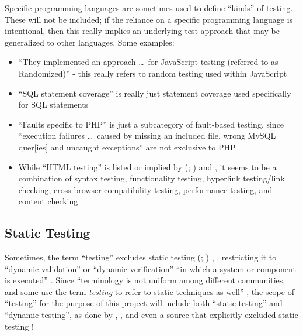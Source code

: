 \ifnotpaper
    Specific programming languages are sometimes used to define ``kinds'' of
    testing. These will not be included; if the reliance
    on a specific programming language is intentional, then this really implies an
    underlying test approach that may be generalized to other languages. Some
    examples:

    \begin{itemize}
        \item ``They implemented an approach \dots\ for JavaScript testing
              (referred to as Randomized)'' \citep[p.~192]{DoğanEtAl2014} -
              this really refers to random testing used within JavaScript
        \item ``SQL statement coverage'' is really just statement coverage
              used specifically for SQL statements \citep[Tab.~13]{DoğanEtAl2014}
        \item ``Faults specific to PHP'' is just a subcategory of fault-based
              testing, since ``execution failures \dots\ caused by missing an
              included file, wrong MySQL quer[ies] and uncaught exceptions''
              are not exclusive to PHP \citep[Tab.~27]{DoğanEtAl2014}
        \item While ``HTML testing'' is listed or implied by
              \citeauthor{Gerrard2000a} (\citeyear[Tab.~2]{Gerrard2000a};
              \citeyear[Tab.~1, p.~3]{Gerrard2000b}) and
              \citet[p.~220]{Patton2006}, it seems to be a combination of syntax
              testing, functionality testing, hyperlink testing/link checking,
              cross-browser compatibility testing, performance testing, and
              content checking \citep[p.~3]{Gerrard2000b}
    \end{itemize}
\fi

\subsection{Static Testing}
\label{static-test}
Sometimes, the term ``testing'' excludes static testing
\ifnotpaper
    (\citealp[p.~222]{AmmannAndOffutt2017}; \citealp[p.~13]{Firesmith2015})%
\else
    \cite[p.~222]{AmmannAndOffutt2017}, \cite[p.~13]{Firesmith2015}%
\fi, restricting it to ``dynamic validation'' \citep[p.~5-1]{SWEBOK2024} or
``dynamic verification'' ``in which a system or component is
executed'' \citep[p.~427]{IEEE2017}. Since ``terminology is not uniform
among different communities, and some use the term \emph{testing} to refer to
static techniques as well''
\citep[p.~5-2]{SWEBOK2024}, the scope of ``testing'' for the purpose of this
project will include both ``static testing'' and ``dynamic testing'', as
done by \citet[p.~17]{IEEE2022}, \citet[pp.~8-9]{Gerrard2000a}, and even a
source that explicitly excluded static testing \citep[p.~440]{IEEE2017}!

